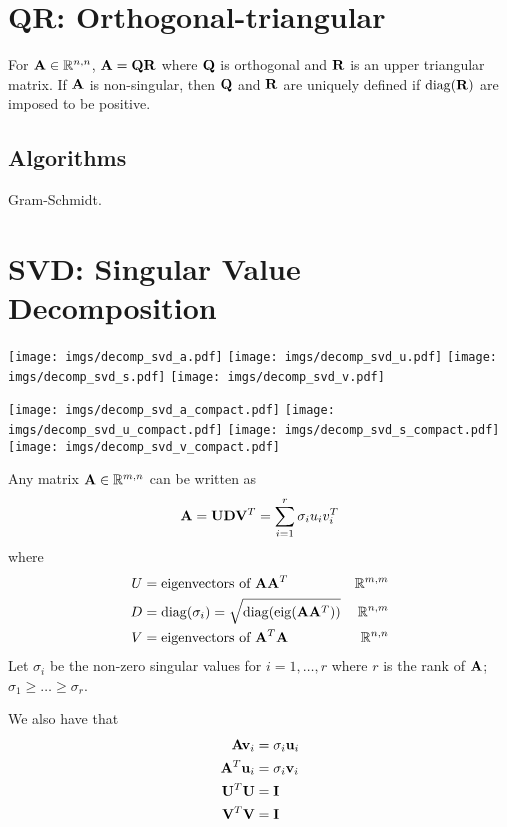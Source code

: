 \section{QR: Orthogonal-triangular}

For $\mathbf{A}\in\mathbb{R}^{n,n}$, $\mathbf{A}=\mathbf{Q}\mathbf{R}$ where $\mathbf{Q}$ is orthogonal and $\mathbf{R}$ is an upper triangular matrix. If $\mathbf{A}$ is non-singular, then $\mathbf{Q}$ and $\mathbf{R}$ are uniquely defined if $\operatorname{diag}(\mathbf{R})$ are imposed to be positive.

\subsection*{Algorithms}

Gram-Schmidt.




\section{SVD: Singular Value Decomposition}

\begin{center}
\texttt{[image: imgs/decomp\_svd\_a.pdf]}
\texttt{[image: imgs/decomp\_svd\_u.pdf]}
\texttt{[image: imgs/decomp\_svd\_s.pdf]}
\texttt{[image: imgs/decomp\_svd\_v.pdf]}
\end{center}

\begin{center}
\texttt{[image: imgs/decomp\_svd\_a\_compact.pdf]}
\texttt{[image: imgs/decomp\_svd\_u\_compact.pdf]}
\texttt{[image: imgs/decomp\_svd\_s\_compact.pdf]}
\texttt{[image: imgs/decomp\_svd\_v\_compact.pdf]}
\end{center}

Any matrix $\mathbf{A}\in\mathbb{R}^{m,n}$ can be written as
\begin{equation}
\mathbf{A}=\mathbf{U} \mathbf{D} \mathbf{V}^T=\sum_{i=1}^r \sigma_i u_i v_i^T
\end{equation}
where
\begin{align}
U&=\textrm{eigenvectors of~}\mathbf{A}\mathbf{A}^T & \mathbb{R}^{m,m} \\
D&=\operatorname{diag}(\sigma_i)=\sqrt{\operatorname{diag}(\operatorname{eig}(\mathbf{A}\mathbf{A}^T))}      & \mathbb{R}^{n,m} \\
V&=\textrm{eigenvectors of~}\mathbf{A}^T\mathbf{A} & \mathbb{R}^{n,n}
\end{align}
Let $\sigma_i$ be the non-zero singular values for $i=1,\ldots,r$ where $r$ is the rank of $\mathbf{A}$; $\sigma_1\ge\ldots\ge\sigma_r$.

We also have that
\begin{align}
\mathbf{A}   \mathbf{v}_i &= \sigma_i \mathbf{u}_i \\
\mathbf{A}^T \mathbf{u}_i &= \sigma_i \mathbf{v}_i \\
\mathbf{U}^T\mathbf{U} &= \mathbf{I} \\
\mathbf{V}^T\mathbf{V} &= \mathbf{I}
\end{align}

